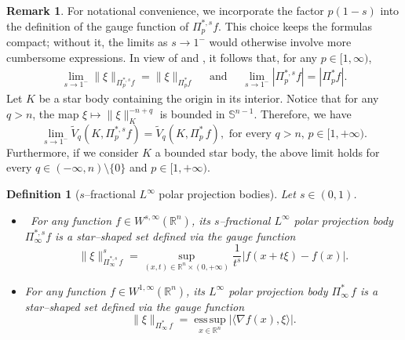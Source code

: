 \documentclass[11pt, reqno]{article}
\newtheorem{definition}[theorem]{Definition}
\theoremstyle{definition}
\numberwithin{equation}{section}
\newtheorem{remark}[theorem]{Remark}
\newcommand{\R}{\mathbb{R}}
\newcommand{\Sphere}{\mathbb{S}^{n - 1}}
\newcommand{\esssup}{\operatorname*{ess\,sup}}
\begin{document}
\begin{remark}
For notational convenience, we incorporate the factor \(p(1-s)\) into the definition of the gauge function of \(\Pi^{\ast, s}_p f\). 
This choice keeps the formulas compact; without it, the limits as \(s \to 1^{-}\) would otherwise involve more cumbersome expressions. 
In view of \cite[Theorem~9]{HL_2024} and \cite[Theorem~3]{HL_2025}, it follows that, 
for any \(p \in [1, \infty)\),
\begin{align*}
	\displaystyle \lim_{s \to 1^-} \| \xi \|_{\Pi^{\ast, s}_p f} = \| \xi \|_{\Pi^\ast_p f} \quad \text{ and } \quad
	\displaystyle \lim_{s \to 1^-} |\Pi^{\ast, s}_p f| = |\Pi^\ast_p f|.
\end{align*}
Let $K$ be a star body containing the origin in its interior.
Notice that for any $q > n$, the map $\xi \mapsto \| \xi \|_K^{-n + q}$ is bounded in $\Sphere$.
Therefore, we have
\[
	\lim_{s \to 1^-} \widetilde{V}_q\!\left(K, \Pi^{\ast, s}_p f\right) 
	= \widetilde{V}_q\!\left(K, \Pi^\ast_p \, f\right), \text{ for every } q > n, \, p \in [1, + \infty).
\]
Furthermore, if we consider $K$ a bounded star body, the above limit holds for every $q \in (- \infty, n) \setminus \{ 0 \}$ and $p \in [1, + \infty)$.
\end{remark}

\begin{definition}[$s$--fractional $L^\infty$ polar projection bodies]\label{def.Linfty}
Let $s \in (0, 1)$.
\begin{itemize}
    \item[$\bullet$] \
    For any function $f \in W^{s, \infty}(\R^n)$, its \textit{$s$--fractional $L^\infty$ polar projection body} $\Pi^{\ast, s}_\infty  f$ is a star--shaped set defined via the gauge function
	\begin{equation}
		\| \xi \|_{\Pi^{\ast, s}_\infty \, f}^s = \sup_{(x, t) \in \R^n \times (0, + \infty)} \dfrac{1}{t^{s}}|f(x + t\xi) - f(x)|.
	\end{equation}

    \item[$\bullet$]
    For any function $f \in W^{1, \infty}(\R^n)$, its \textit{$L^\infty$ polar projection body} $\Pi^{\ast}_\infty \, f$ is a star--shaped set defined via the gauge function
	\begin{equation}
		\| \xi \|_{\Pi^{\ast}_\infty \, f} = \esssup_{x \in \R^n} |\langle \nabla f(x), \xi \rangle |.
	\end{equation}
\end{itemize}    
\end{definition}
\end{document}
